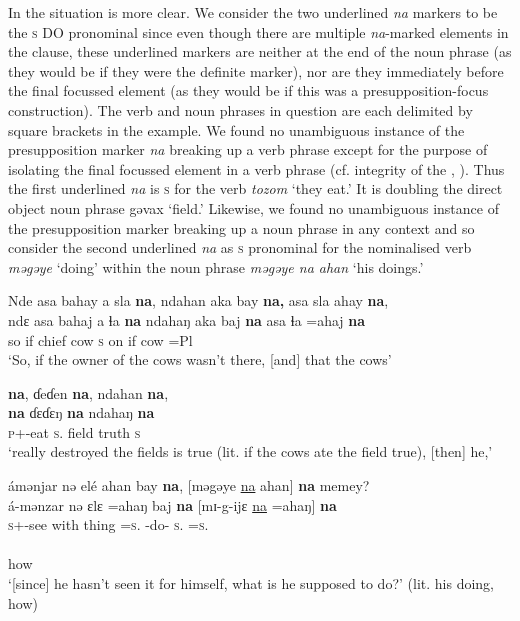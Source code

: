 In   the situation is more clear. We consider the two underlined \textit{na}  markers to be the \textsc{s} DO pronominal since even though there are multiple \textit{na}{}-marked elements in the clause, these underlined markers are neither at the end of the noun phrase (as they would be if they were the definite marker), nor are they immediately before the final focussed element (as they would be if this was a presupposition-focus construction). The verb and noun phrases in question are each delimited by square brackets in the example. We found no unambiguous instance of the presupposition marker \textit{na} breaking up a verb phrase except for the purpose of isolating the final focussed element in a verb phrase (cf. integrity of the \VP, ). Thus the first underlined \textit{na}  is \textsc{s} \DO for the verb \textit{tozom} ‘they eat.’ It is doubling the direct object noun phrase gəvax ‘field.' Likewise, we found no unambiguous instance of the presupposition marker breaking up a noun phrase in any context and so consider the second underlined \textit{na} as \textsc{s} \DO pronominal for the nominalised verb \textit{məgəye} ‘doing’ within the noun phrase \textit{məgəye na ahan} ‘his doings.’  

\largerpage
\ea \label{ex:11:53}
Nde  asa  bahay  a  sla  \textbf{na},  ndahan  aka  bay  \textbf{na,} asa  sla  ahay  \textbf{na},\\ 
\gll  ndɛ  asa   bahaj  a  ɬa  \textbf{na}  ndahaŋ  aka   baj  \textbf{na} asa ɬa  =ahaj \textbf{na}\\ 
      so  if  chief  {\GEN}  cow  {\PSP}  \textsc{s}  on  {\NEG}  {\PSP} if  cow  =Pl  {\PSP} \\ 
\glt ‘So, if the owner of the cows wasn’t there, [and] that the cows’ 

  \textbf{na},  ɗeɗen  \textbf{na},  ndahan  \textbf{na},\\  
 \textbf{na} {ɗɛɗɛŋ} \textbf{na} {ndahaŋ} \textbf{na}\\  
     \textsc{p}+{\PFV}-eat  \textsc{s}.{\DO}  field  {\PSP}  truth  {\PSP} \textsc{s} {\PSP} \\ 
\glt ‘really destroyed the fields  is true (lit. if the cows ate the field true), [then] he,’

\medskip
ámənjar  nə  elé  ahan  bay  \textbf{na},  [məgəye  \underline{na}  ahan]  \textbf{na}  memey?\\
\gll á-mənzar nə ɛlɛ  =ahaŋ baj \textbf{na} [{mɪ-g-ijɛ} \underline{na} {=ahaŋ}] \textbf{na}\\ 
     \textsc{s}+{\IFV}-see  with  thing  =\textsc{s}.{\POSS}  {\NEG}  {\PSP} {\NOM}-do{}-{\CL} \textsc{s}.{\DO}  =\textsc{s}.{\POSS}  {\PSP}\\  
     
     \medskip
{}\\
     how\\
\glt  ‘[since] he hasn’t seen it for himself, what is he supposed to do?’ (lit. his doing, how)
\z
{}